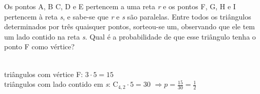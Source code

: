 \begin{ex}
Os pontos A, B C, D e E pertencem a uma reta \textit{r} e os pontos F, G, H e I pertencem à reta \textit{s}, e sabe-se que \textit{r} e \textit{s} são paralelas.  Entre todos os triângulos determinados por três quaisquer pontos, sorteou-se um, observando que ele tem um lado contido na reta \textit{s}. Qual é a probabilidade de que esse triângulo tenha o ponto F como vértice?
  \begin{sol}
   \phantom{A}\\
   triângulos com vértice F:\hspace{0,3cm} $3\cdot5=15$ \\
   triângulos com lado contido em \textit{s}: \hspace{0,3cm}  $\mathrm{C}_{4,2}\cdot5=30$
   $\Longrightarrow p=\frac{15}{30}=\frac{1}{2}$
  \end{sol}
\end{ex}